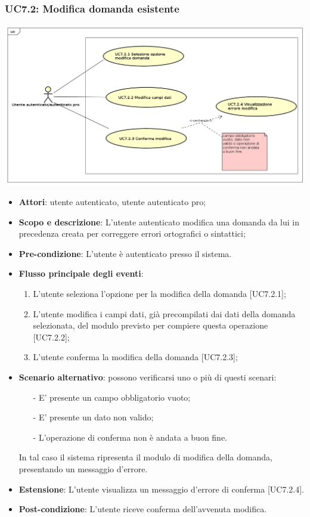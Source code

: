 	\subsubsection{UC7.2: Modifica domanda esistente}
	\begin{center}
		\includegraphics[scale=0.5]{UML/UC7.2.png}
	\end{center}
	\begin{itemize}
		\item
			\textbf{Attori}: utente autenticato, utente autenticato pro;
		\item		
			\textbf{Scopo e descrizione}: L'utente autenticato modifica una domanda da lui in precedenza creata per correggere errori ortografici o sintattici;
		\item
			\textbf{Pre-condizione}: L'utente è autenticato presso il sistema. 
		\item
			\textbf{Flusso principale degli eventi}:
	       		\begin{enumerate}
					\item 	
					L'utente seleziona l'opzione per la modifica della domanda [UC7.2.1];
					\item
					L'utente modifica i campi dati, già precompilati dai dati della domanda selezionata, del modulo previsto per compiere questa operazione [UC7.2.2];
					\item
					L'utente conferma la modifica della domanda [UC7.2.3];
	 			\end{enumerate}
	 	\item
	 		\textbf{Scenario alternativo}: possono verificarsi uno o più di questi scenari:
				\begin{itemize}
					\item[-] 	
						E' presente un campo obbligatorio vuoto;
					\item[-] 
    						E' presente  un dato non valido;
					\item[-] 
						L'operazione di conferma non è andata a buon fine.
				\end{itemize}
			In tal caso il sistema ripresenta il modulo di modifica della domanda, presentando un messaggio d'errore.
		\item
			\textbf{Estensione}: L'utente visualizza un messaggio d'errore di conferma [UC7.2.4].
		\item
			\textbf{	Post-condizione}: L'utente riceve conferma dell'avvenuta modifica.
	\end{itemize}
